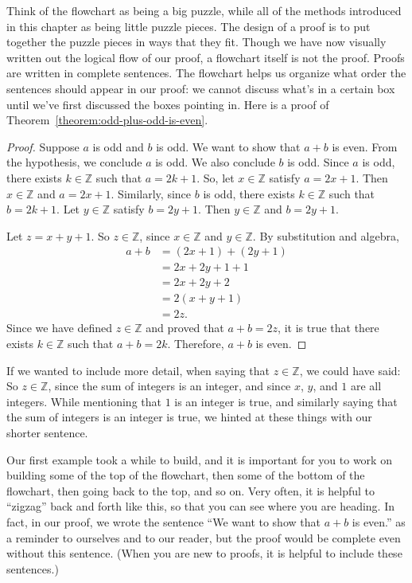 \documentclass{book}
\theoremstyle{ekimcustom}
\begin{document}
Think of the flowchart as being a big puzzle, while all of the methods introduced in this chapter as being little puzzle pieces. The design of a proof is to put together the puzzle pieces in ways that they fit. Though we have now visually written out the logical flow of our proof, a flowchart itself is not the proof. Proofs are written in complete sentences. The flowchart helps us organize what order the sentences should appear in our proof: we cannot discuss what's in a certain box until we've first discussed the boxes pointing in. Here is a proof of Theorem~\ref{theorem:odd-plus-odd-is-even}.
\begin{proof}
Suppose $a$ is odd and $b$ is odd. We want to show that $a+b$ is even. From the hypothesis, we conclude $a$ is odd. We also conclude $b$ is odd. Since $a$ is odd, there exists $k \in \mathbb{Z}$ such that $a=2k+1$. So, let $x \in \mathbb{Z}$ satisfy $a=2x+1$. Then $x \in \mathbb{Z}$ and $a=2x+1$. Similarly, since $b$ is odd, there exists $k \in \mathbb{Z}$ such that $b=2k+1$. Let $y \in \mathbb{Z}$ satisfy $b=2y+1$. Then $y \in \mathbb{Z}$ and $b=2y+1$.

Let $z = x+y+1$. So $z \in \mathbb{Z}$, since $x \in \mathbb{Z}$ and $y \in \mathbb{Z}$. By substitution and algebra,
\begin{align*}
a + b
&= (2x+1) + (2y+1)\\
&= 2x+2y+1+1\\
&= 2x+2y+2\\
&= 2(x+y+1)\\
&= 2z.
\end{align*}
Since we have defined $z \in \mathbb{Z}$ and proved that $a+b=2z$, it is true that there exists $k \in \mathbb{Z}$ such that $a+b=2k$. Therefore, $a+b$ is even.
\end{proof}
If we wanted to include more detail, when saying that $z \in \mathbb{Z}$, we could have said: So $z \in \mathbb{Z}$, since the sum of integers is an integer, and since $x$, $y$, and $1$ are all integers. While mentioning that $1$ is an integer is true, and similarly saying that the sum of integers is an integer is true, we hinted at these things with our shorter sentence.

Our first example took a while to build, and it is important for you to work on building some of the top of the flowchart, then some of the bottom of the flowchart, then going back to the top, and so on. Very often, it is helpful to ``zigzag'' back and forth like this, so that you can see where you are heading. In fact, in our proof, we wrote the sentence ``We want to show that $a+b$ is even.'' as a reminder to ourselves and to our reader, but the proof would be complete even without this sentence. (When you are new to proofs, it is helpful to include these sentences.)
\end{document}
